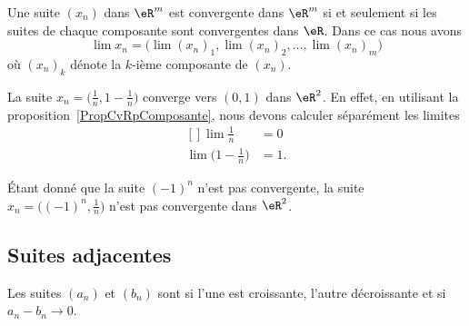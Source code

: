\begin{proposition}		\label{PropCvRpComposante}
	Une suite $(x_n)$ dans $\eR^m$ est convergente dans $\eR^m$ si et seulement si les suites de chaque composante sont convergentes dans $\eR$. Dans ce cas nous avons
	 \begin{equation}
		 \lim x_n=\Big( \lim(x_n)_1,\lim (x_n)_2,\ldots,\lim (x_n)_m \Big)
	 \end{equation}
	 où $(x_n)_k$ dénote la $k$-ième composante de $(x_n)$.
\end{proposition}

\begin{example}
	La suite $x_n=\big( \frac{1}{ n },1-\frac{1}{ n } \big)$ converge vers $(0,1)$ dans $\eR^2$. En effet, en utilisant la proposition~\ref{PropCvRpComposante}, nous devons calculer séparément les limites
	\begin{equation}
		\begin{aligned}[]
			\lim\frac{1}{ n }&=0\\
			\lim\big( 1-\frac{1}{ n } \big)&=1.
		\end{aligned}
	\end{equation}
\end{example}

\begin{example}
	Étant donné que la suite $(-1)^n$ n'est pas convergente, la suite $x_n=\big( (-1)^n,\frac{1}{ n } \big)$ n'est pas convergente dans $\eR^2$.
\end{example}

\subsection{Suites adjacentes}

\begin{definition}       \label{DEFooDMZLooDtNPmu}
    Les suites \( (a_n)\) et \( (b_n)\) sont  si l'une est croissante, l'autre décroissante et si \( a_n-b_n\to 0\).
\end{definition}

